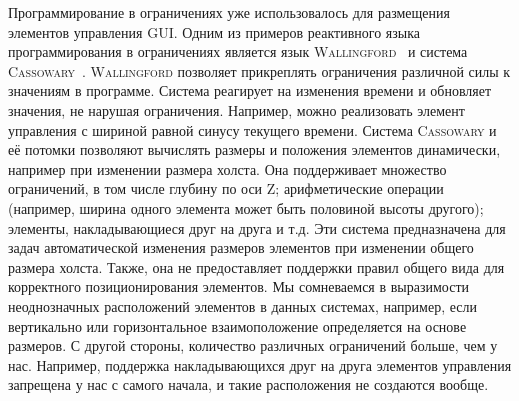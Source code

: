 
Программирование в ограничениях уже использовалось для размещения элементов управления GUI. Одним из примеров реактивного языка программирования в ограничениях является язык \textsc{Wallingford}~\cite{Wallingford2016} и система \textsc{Cassowary}~\cite{Cassowary2001}. \textsc{Wallingford} позволяет прикреплять ограничения различной силы к значениям в программе. Система реагирует на изменения времени и обновляет значения, не нарушая ограничения. Например, можно реализовать элемент управления с шириной равной синусу текущего времени. Система \textsc{Cassowary} и её потомки позволяют вычислять размеры и положения элементов динамически, например при изменении размера холста. Она поддерживает множество ограничений, в том числе глубину по оси Z; арифметические операции (например, ширина одного элемента может быть половиной высоты другого); элементы, накладывающиеся друг на друга и т.д. Эти система предназначена для задач автоматической изменения размеров элементов при изменении общего размера холста. Также, она не предоставляет поддержки правил общего вида для корректного позиционирования элементов.
Мы сомневаемся в выразимости неоднозначных расположений элементов в данных системах, например, если вертикально или горизонтальное взаимоположение определяется на основе размеров. С другой стороны, количество различных ограничений больше, чем у нас. Например, поддержка накладывающихся друг на друга элементов управления запрещена у нас с самого начала, и такие расположения не создаются вообще.

